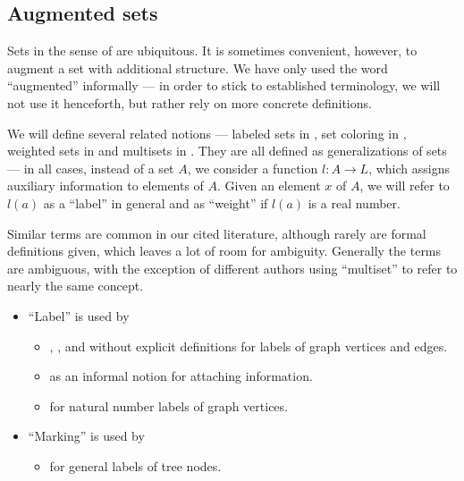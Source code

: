 \subsection{Augmented sets}\label{subsec:augmented_sets}

Sets in the sense of  are ubiquitous. It is sometimes convenient, however, to augment a set with additional structure. We have only used the word \enquote{augmented} informally --- in order to stick to established terminology, we will not use it henceforth, but rather rely on more concrete definitions.

\begin{remark}\label{rem:set_labeling_terminology}
  We will define several related notions --- labeled sets in , set coloring in , weighted sets in  and multisets in . They are all defined as generalizations of sets --- in all cases, instead of a set \( A \), we consider a function \( l: A \to L \), which assigns auxiliary information to elements of \( A \). Given an element \( x \) of \( A \), we will refer to \( l(a) \) as a \enquote{label} in general and as \enquote{weight} if \( l(a) \) is a real number.

  Similar terms are common in our cited literature, although rarely are formal definitions given, which leaves a lot of room for ambiguity. Generally the terms are ambiguous, with the exception of different authors using \enquote{multiset} to refer to nearly the same concept.

  \begin{itemize}
    \item \enquote{Label} is used by
    \begin{itemize}
      \item {},  ,  and  without explicit definitions for labels of graph vertices and edges.

      \item {} as an informal notion for attaching information.

      \item {} for natural number labels of graph vertices.
    \end{itemize}

    \item \enquote{Marking} is used by
    \begin{itemize}
      \item {} for general labels of tree nodes.


\end{itemize}
\end{itemize}
\end{remark}

